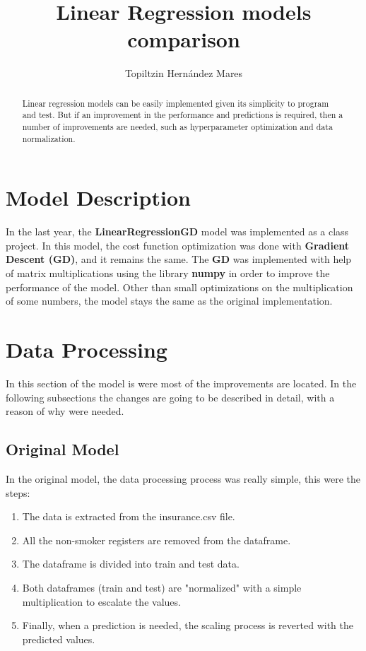 \documentclass[11pt]{article}
\title{Linear Regression models comparison}
\author{Topiltzin Hernández Mares}
\begin{document}
\maketitle

\begin{abstract}
    Linear regression models can be easily implemented given its simplicity to program and test.
    But if an improvement in the performance and predictions is required, then a number of improvements are needed,
    such as hyperparameter optimization and data normalization.
\end{abstract}

\section{Model Description}\label{sec:model_description}
    In the last year, the \textbf{LinearRegressionGD} model was implemented as a class project.
    In this model, the cost function optimization was done with \textbf{Gradient Descent (GD)}, and it remains the same.
    The \textbf{GD} was implemented with help of matrix multiplications using the library \textbf{numpy} in order to
    improve the performance of the model.
    Other than small optimizations on the multiplication of some numbers, the model stays the same as the original
    implementation.

\section{Data Processing}\label{sec:data_processing}
In this section of the model is were most of the improvements are located. In the following subsections the changes are
going to be described in detail, with a reason of why were needed.

\subsection{Original Model}
    In the original model, the data processing process was really simple, this were the steps:
    \begin{enumerate}
        \item The data is extracted from the insurance.csv file.
        \item All the non-smoker registers are removed from the dataframe.
        \item The dataframe is divided into train and test data.
        \item Both dataframes (train and test) are "normalized" with a simple multiplication to escalate the values.
        \item Finally, when a prediction is needed, the scaling process is reverted with the predicted values.
    \end{enumerate}
\end{document}
